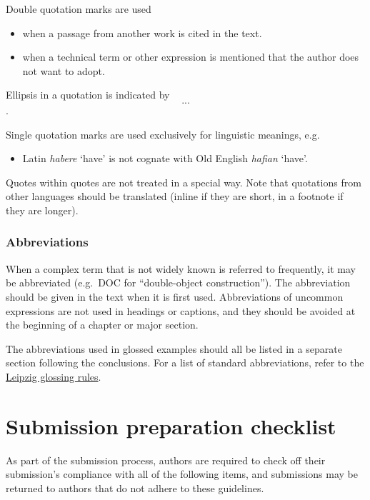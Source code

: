 \documentclass[]{glossa}
\providecommand{\tightlist}{%
  \setlength{\itemsep}{0pt}\setlength{\parskip}{0pt}}
\begin{document}
Double quotation marks are used

\begin{itemize}
\item
  when a passage from another work is cited in the text.
\item
  when a technical term or other expression is mentioned that the author
  does not want to adopt.
\end{itemize}

Ellipsis in a quotation is indicated by \[...\].

Single quotation marks are used exclusively for linguistic meanings,
e.g.

\begin{itemize}
\tightlist
\item
  Latin \emph{habere} `have' is not cognate with Old English
  \emph{hafian} `have'.
\end{itemize}

Quotes within quotes are not treated in a special way. Note that
quotations from other languages should be translated (inline if they are
short, in a footnote if they are longer).

\hypertarget{abbreviations}{%
\subsubsection{Abbreviations}\label{abbreviations}}

When a complex term that is not widely known is referred to frequently,
it may be abbreviated (e.g.~DOC for ``double-object construction''). The
abbreviation should be given in the text when it is first used.
Abbreviations of uncommon expressions are not used in headings or
captions, and they should be avoided at the beginning of a chapter or
major section.

The abbreviations used in glossed examples should all be listed in a
separate section following the conclusions. For a list of standard
abbreviations, refer to the
\href{https://www.eva.mpg.de/lingua/resources/glossing-rules.php}{Leipzig
glossing rules}.

\hypertarget{submission-preparation-checklist}{%
\section{Submission preparation
checklist}\label{submission-preparation-checklist}}

As part of the submission process, authors are required to check off
their submission's compliance with all of the following items, and
submissions may be returned to authors that do not adhere to these
guidelines.
\end{document}
